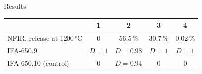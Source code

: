 \documentclass[10pt,aspectratio=169]{beamer}
\begin{document}


\begin{frame}{Results}
\centering
\begin{tabular}{lcccc}
\toprule
 & 1 & 2 & 3 & 4\\
\midrule
NFIR, release at 1200\,$^\circ$C & 0 & 56.5\,\% & 30.7\,\% & 0.02\,\%\\
IFA-650.9 & $D=1$ & $D=0.98$ & $D=1$ & $D=1$\\
IFA-650.10 (control) & 0 & $D=0.94$ & 0 & 0\\
\bottomrule
\end{tabular}
\end{frame}
\end{document}
